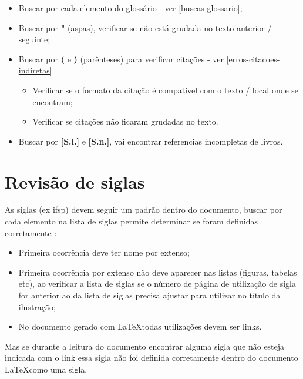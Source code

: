 \begin{itemize}
    \item Buscar por cada elemento do glossário - ver \autoref{buscas-glossario};
            
    \item Buscar por \textbf{"} (aspas), verificar se não está grudada no texto anterior / seguinte;
    
    \item Buscar por \textbf{(} e \textbf{)} (parênteses) para verificar citações - ver \autoref{erros-citacoes-indiretas}
        \begin{itemize}
            \item Verificar se o formato da citação é compatível com o texto / local onde se encontram;
            
            \item Verificar se citações não ficaram grudadas no texto.
        \end{itemize}
            
    \item Buscar por \textbf{[S.l.]} e \textbf{[S.n.]}, vai encontrar referencias incompletas de livros.
\end{itemize}

\section{Revisão de siglas}
\label{buscas-siglas}

As siglas (ex \ac{ifsp}) devem seguir um padrão dentro do documento, buscar por cada elemento na lista de siglas permite determinar se foram definidas corretamente :

\begin{itemize}
    \item Primeira ocorrência deve ter nome por extenso;
    
    \item Primeira ocorrência por extenso não deve aparecer nas listas (figuras, tabelas etc), ao verificar a lista de siglas se o número de página de utilização de sigla for anterior ao da lista de siglas precisa ajustar para utilizar  no título da ilustração;

    \item No documento gerado com \LaTeX \space todas utilizações devem ser links.
\end{itemize}

Mas se durante a leitura do documento encontrar alguma sigla que não esteja indicada com o link essa sigla não foi definida corretamente dentro do documento \LaTeX  \space como uma sigla.

